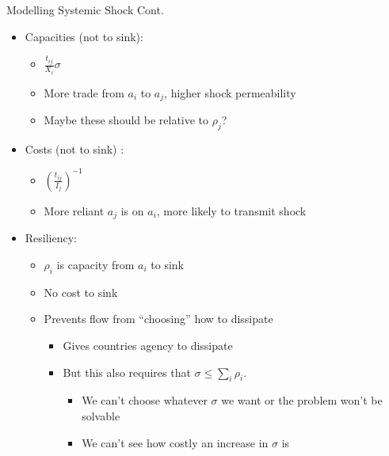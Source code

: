 \documentclass[
  ignorenonframetext,
]{beamer}
\providecommand{\tightlist}{%
  \setlength{\itemsep}{0pt}\setlength{\parskip}{0pt}}
\begin{document}
\begin{frame}{Modelling Systemic Shock Cont.}
\protect\hypertarget{modelling-systemic-shock-cont.}{}

\begin{itemize}
\tightlist
\item
  Capacities (not to sink):

  \begin{itemize}
  \tightlist
  \item
    \(\frac{t_{ij}}{X_i}\sigma\)
  \item
    More trade from \(a_i\) to \(a_j\), higher shock permeability
  \item
    Maybe these should be relative to \(\rho_j\)?
  \end{itemize}
\item
  Costs (not to sink) :

  \begin{itemize}
  \tightlist
  \item
    \(\left(\frac{t_{ij}}{I_j}\right)^{-1}\)
  \item
    More reliant \(a_j\) is on \(a_i\), more likely to transmit shock
  \end{itemize}
\item
  Resiliency:

  \begin{itemize}
  \tightlist
  \item
    \(\rho_i\) is capacity from \(a_i\) to sink
  \item
    No cost to sink
  \item
    Prevents flow from ``choosing'' how to dissipate

    \begin{itemize}
    \tightlist
    \item
      Gives countries agency to dissipate
    \item
      But this also requires that \(\sigma\leq\sum_i\rho_i\).

      \begin{itemize}
      \tightlist
      \item
        We can't choose whatever \(\sigma\) we want or the problem won't
        be solvable
      \item
        We can't see how costly an increase in \(\sigma\) is
      \end{itemize}
    \end{itemize}
  \end{itemize}
\end{itemize}

\end{frame}
\end{document}
